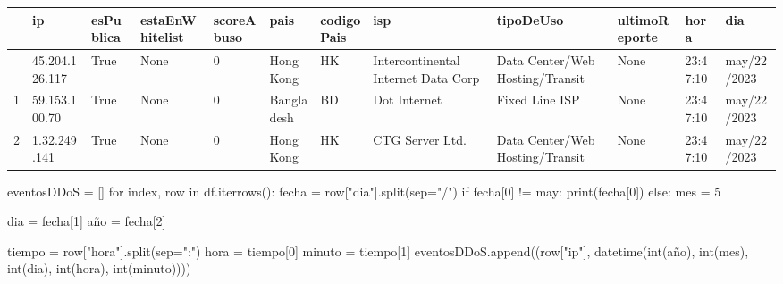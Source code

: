 \documentclass[
  letterpaper,
  DIV=11,
  numbers=noendperiod]{scrartcl}
\newenvironment{Shaded}{\begin{snugshade}}{\end{snugshade}}
\newcommand{\BuiltInTok}[1]{\textcolor[rgb]{0.00,0.23,0.31}{#1}}
\newcommand{\ControlFlowTok}[1]{\textcolor[rgb]{0.00,0.23,0.31}{#1}}
\newcommand{\DecValTok}[1]{\textcolor[rgb]{0.68,0.00,0.00}{#1}}
\newcommand{\KeywordTok}[1]{\textcolor[rgb]{0.00,0.23,0.31}{#1}}
\newcommand{\NormalTok}[1]{\textcolor[rgb]{0.00,0.23,0.31}{#1}}
\newcommand{\OperatorTok}[1]{\textcolor[rgb]{0.37,0.37,0.37}{#1}}
\newcommand{\StringTok}[1]{\textcolor[rgb]{0.13,0.47,0.30}{#1}}
\begin{document}
\begin{longtable}[]{@{}llllllllllll@{}}
\toprule\noalign{}
& ip & esPublica & estaEnWhitelist & scoreAbuso & pais & codigoPais &
isp & tipoDeUso & ultimoReporte & hora & dia \\
\midrule\noalign{}
\endhead
\bottomrule\noalign{}
\endlastfoot
0 & 45.204.126.117 & True & None & 0 & Hong Kong & HK & Intercontinental
Internet Data Corp & Data Center/Web Hosting/Transit & None & 23:47:10 &
may/22/2023 \\
1 & 59.153.100.70 & True & None & 0 & Bangladesh & BD & Dot Internet &
Fixed Line ISP & None & 23:47:10 & may/22/2023 \\
2 & 1.32.249.141 & True & None & 0 & Hong Kong & HK & CTG Server Ltd. &
Data Center/Web Hosting/Transit & None & 23:47:10 & may/22/2023 \\
\end{longtable}

\begin{Shaded}
\begin{Highlighting}[]
\NormalTok{eventosDDoS }\OperatorTok{=}\NormalTok{ []}
\ControlFlowTok{for}\NormalTok{ index, row }\KeywordTok{in}\NormalTok{ df.iterrows():}
\NormalTok{    fecha }\OperatorTok{=}\NormalTok{ row[}\StringTok{"dia"}\NormalTok{].split(sep}\OperatorTok{=}\StringTok{"/"}\NormalTok{)}
    \ControlFlowTok{if}\NormalTok{ fecha[}\DecValTok{0}\NormalTok{] }\OperatorTok{!=} \StringTok{\textquotesingle{}may\textquotesingle{}}\NormalTok{:}
        \BuiltInTok{print}\NormalTok{(fecha[}\DecValTok{0}\NormalTok{])}
    \ControlFlowTok{else}\NormalTok{:}
\NormalTok{        mes }\OperatorTok{=} \DecValTok{5}
        
\NormalTok{    dia }\OperatorTok{=}\NormalTok{ fecha[}\DecValTok{1}\NormalTok{]}
\NormalTok{    año }\OperatorTok{=}\NormalTok{ fecha[}\DecValTok{2}\NormalTok{]}
    
\NormalTok{    tiempo }\OperatorTok{=}\NormalTok{ row[}\StringTok{"hora"}\NormalTok{].split(sep}\OperatorTok{=}\StringTok{":"}\NormalTok{)}
\NormalTok{    hora }\OperatorTok{=}\NormalTok{ tiempo[}\DecValTok{0}\NormalTok{]}
\NormalTok{    minuto }\OperatorTok{=}\NormalTok{ tiempo[}\DecValTok{1}\NormalTok{]}
\NormalTok{    eventosDDoS.append((row[}\StringTok{"ip"}\NormalTok{], datetime(}\BuiltInTok{int}\NormalTok{(año), }\BuiltInTok{int}\NormalTok{(mes), }\BuiltInTok{int}\NormalTok{(dia), }\BuiltInTok{int}\NormalTok{(hora), }\BuiltInTok{int}\NormalTok{(minuto))))}
\end{Highlighting}
\end{Shaded}
\end{document}
